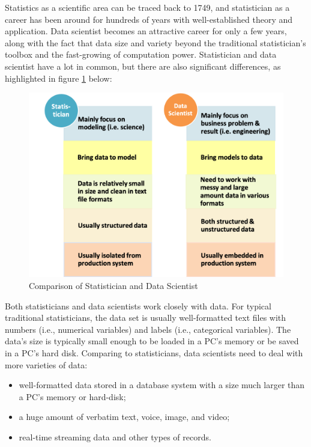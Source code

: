 \documentclass[
  12pt,
]{krantz}
\providecommand{\tightlist}{%
  \setlength{\itemsep}{0pt}\setlength{\parskip}{0pt}}
\begin{document}
Statistics as a scientific area can be traced back to 1749, and statistician as a career has been around for hundreds of years with well-established theory and application. Data scientist becomes an attractive career for only a few years, along with the fact that data size and variety beyond the traditional statistician's toolbox and the fast-growing of computation power. Statistician and data scientist have a lot in common, but there are also significant differences, as highlighted in figure \ref{fig:softskill1} below:

\begin{figure}

{\centering \includegraphics[width=0.8\linewidth]{images/softskill1} 

}

\caption{Comparison of Statistician and Data Scientist}\label{fig:softskill1}
\end{figure}

Both statisticians and data scientists work closely with data. For typical traditional statisticians, the data set is usually well-formatted text files with numbers (i.e., numerical variables) and labels (i.e., categorical variables). The data's size is typically small enough to be loaded in a PC's memory or be saved in a PC's hard disk. Comparing to statisticians, data scientists need to deal with more varieties of data:

\begin{itemize}
\tightlist
\item
  well-formatted data stored in a database system with a size much larger than a PC's memory or hard-disk;
\item
  a huge amount of verbatim text, voice, image, and video;
\item
  real-time streaming data and other types of records.
\end{itemize}
\end{document}
